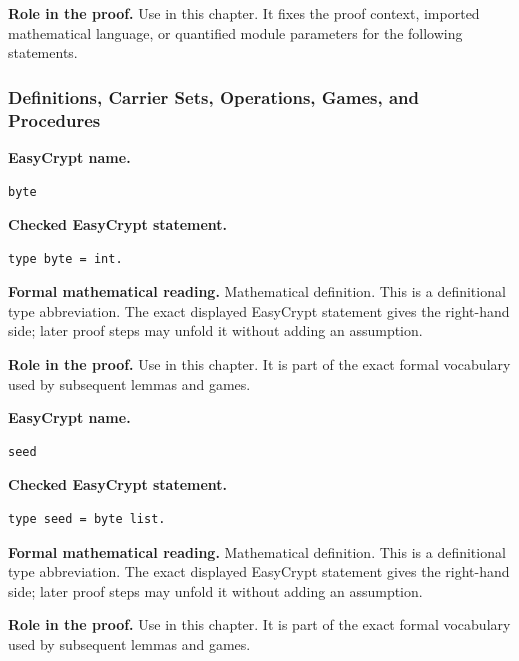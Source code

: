 \noindent\textbf{Role in the proof.}
Use in this chapter. It fixes the proof context, imported mathematical language, or quantified module parameters for the following statements.

\subsubsection*{Definitions, Carrier Sets, Operations, Games, and Procedures}
\begin{formaldefinition}
\noindent\textbf{EasyCrypt name.}
\begin{lstlisting}[language=EasyCrypt,basicstyle=\ttfamily\scriptsize]
byte
\end{lstlisting}
\noindent\textbf{Checked EasyCrypt statement.}
\begin{lstlisting}[language=EasyCrypt,basicstyle=\ttfamily\scriptsize]
type byte = int.
\end{lstlisting}
\noindent\textbf{Formal mathematical reading.}
Mathematical definition. This is a definitional type abbreviation.  The exact displayed EasyCrypt statement gives the right-hand side; later proof steps may unfold it without adding an assumption.

\noindent\textbf{Role in the proof.}
Use in this chapter. It is part of the exact formal vocabulary used by subsequent lemmas and games.

\end{formaldefinition}

\begin{formaldefinition}
\noindent\textbf{EasyCrypt name.}
\begin{lstlisting}[language=EasyCrypt,basicstyle=\ttfamily\scriptsize]
seed
\end{lstlisting}
\noindent\textbf{Checked EasyCrypt statement.}
\begin{lstlisting}[language=EasyCrypt,basicstyle=\ttfamily\scriptsize]
type seed = byte list.
\end{lstlisting}
\noindent\textbf{Formal mathematical reading.}
Mathematical definition. This is a definitional type abbreviation.  The exact displayed EasyCrypt statement gives the right-hand side; later proof steps may unfold it without adding an assumption.

\noindent\textbf{Role in the proof.}
Use in this chapter. It is part of the exact formal vocabulary used by subsequent lemmas and games.

\end{formaldefinition}

